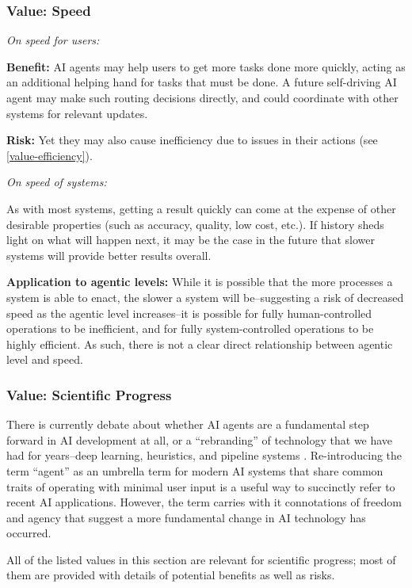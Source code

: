 
\subsubsection{Value: Speed}\label{value-speed}

\textit{On speed for users:}

\vspace{-.5em}
{\bf Benefit:} AI agents may help users to get more tasks done more quickly, acting as an additional helping hand for tasks that must be done. A future self-driving AI agent may make such routing decisions directly, and could coordinate with other systems for relevant updates.

{\bf Risk:} Yet they may also cause inefficiency due to issues in their actions (see \cref{value-efficiency}).

\textit{On speed of systems:}

\vspace{-.5em}
As with most systems, getting a result quickly can come at the expense of other desirable properties (such as accuracy, quality, low cost, etc.). If history sheds light on what will happen next, it may be the case in the future that slower systems will provide better results overall.

{\bf Application to agentic levels:} While it is possible that the more processes a system is able to enact, the slower a system will be--suggesting a risk of decreased speed as the agentic level increases--it is possible for fully human-controlled operations to be inefficient, and for fully system-controlled operations to be highly efficient. As such, there is not a clear direct relationship between agentic level and speed.



\subsubsection{Value: Scientific Progress}\label{value-scientific-progress}

There is currently debate about whether AI agents are a fundamental step forward in AI development at all, or a “rebranding” of technology that we have had for years--deep learning, heuristics, and pipeline systems \cite{}. Re-introducing the term “agent” as an umbrella term for modern AI systems that share common traits of operating with minimal user input is a useful way to succinctly refer to recent AI applications. However, the term carries with it connotations of freedom and agency that suggest a more fundamental change in AI technology has occurred.

All of the listed values in this section are relevant for scientific progress; most of them are provided with details of potential benefits as well as risks.
